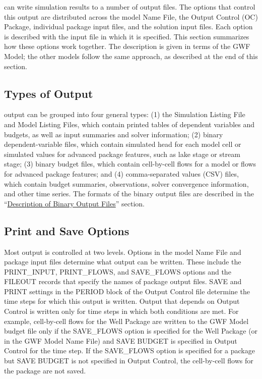 \mf can write simulation results to a number of output files.  The options that control this output are distributed across the model Name File, the Output Control (OC) Package, individual package input files, and the solution input files.  Each option is described with the input file in which it is specified.  This section summarizes how these options work together.  The description is given in terms of the GWF Model; the other models follow the same approach, as described at the end of this section.

\subsection{Types of Output}
\mf output can be grouped into four general types: (1) the Simulation Listing File and Model Listing Files, which contain printed tables of dependent variables and budgets, as well as input summaries and solver information; (2) binary dependent-variable files, which contain simulated head for each model cell or simulated values for advanced package features, such as lake stage or stream stage; (3) binary budget files, which contain cell-by-cell flows for a model or flows for advanced package features; and (4) comma-separated values (CSV) files, which contain budget summaries, observations, solver convergence information, and other time series.  The formats of the binary output files are described in the ``\hyperref[sec:binaryoutput]{Description of Binary Output Files}'' section.

\subsection{Print and Save Options}
Most output is controlled at two levels.  Options in the model Name File and package input files determine what output can be written.  These include the PRINT\_INPUT, PRINT\_FLOWS, and SAVE\_FLOWS options and the FILEOUT records that specify the names of package output files.  SAVE and PRINT settings in the PERIOD block of the Output Control file determine the time steps for which this output is written.  Output that depends on Output Control is written only for time steps in which both conditions are met.  For example, cell-by-cell flows for the Well Package are written to the GWF Model budget file only if the SAVE\_FLOWS option is specified for the Well Package (or in the GWF Model Name File) and SAVE BUDGET is specified in Output Control for the time step.  If the SAVE\_FLOWS option is specified for a package but SAVE BUDGET is not specified in Output Control, the cell-by-cell flows for the package are not saved.


